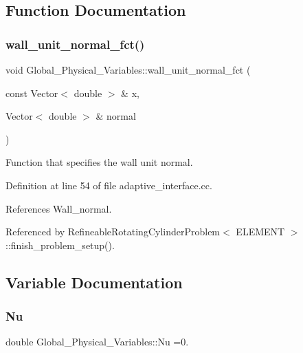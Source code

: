 \subsection{Function Documentation}
\mbox{\label{namespaceGlobal__Physical__Variables_a0d48e8726fa485de2b2df2d5031ec41b}} 
\subsubsection{\texorpdfstring{wall\+\_\+unit\+\_\+normal\+\_\+fct()}{wall\_unit\_normal\_fct()}}
{\footnotesize\ttfamily void Global\+\_\+\+Physical\+\_\+\+Variables\+::wall\+\_\+unit\+\_\+normal\+\_\+fct (\begin{DoxyParamCaption}\item[{const Vector$<$ double $>$ \&}]{x,  }\item[{Vector$<$ double $>$ \&}]{normal }\end{DoxyParamCaption})}



Function that specifies the wall unit normal. 



Definition at line 54 of file adaptive\+\_\+interface.\+cc.



References Wall\+\_\+normal.



Referenced by Refineable\+Rotating\+Cylinder\+Problem$<$ E\+L\+E\+M\+E\+N\+T $>$\+::finish\+\_\+problem\+\_\+setup().



\subsection{Variable Documentation}
\mbox{\label{namespaceGlobal__Physical__Variables_a3962c36313826b19f216f6bbbdd6a477}} 
\subsubsection{\texorpdfstring{Nu}{Nu}}
{\footnotesize\ttfamily double Global\+\_\+\+Physical\+\_\+\+Variables\+::\+Nu =0.}



